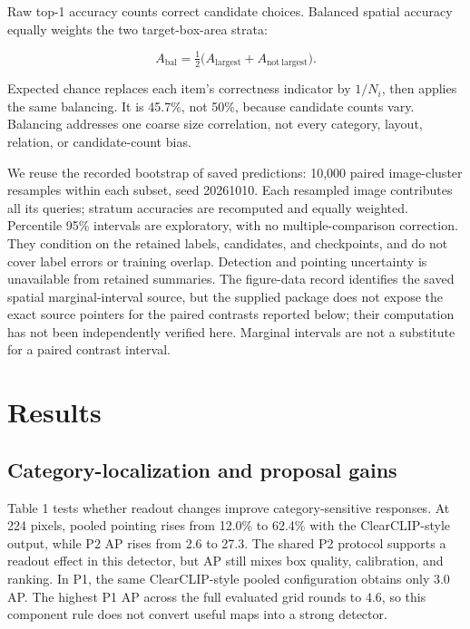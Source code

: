 \documentclass[10pt,twocolumn,letterpaper]{article}
\begin{document}
Raw top-1 accuracy counts correct candidate choices. Balanced spatial
accuracy equally weights the two target-box-area strata:

\[
A_{\mathrm{bal}}=\tfrac12\big(A_{\mathrm{largest}}+A_{\mathrm{not\ largest}}\big).
\]

Expected chance replaces each item's correctness indicator by \(1/N_i\),
then applies the same balancing. It is 45.7\%, not 50\%, because
candidate counts vary. Balancing addresses one coarse size correlation,
not every category, layout, relation, or candidate-count bias.

We reuse the recorded bootstrap of saved predictions: 10,000 paired
image-cluster resamples within each subset, seed 20261010. Each
resampled image contributes all its queries; stratum accuracies are
recomputed and equally weighted. Percentile 95\% intervals are
exploratory, with no multiple-comparison correction. They condition on
the retained labels, candidates, and checkpoints, and do not cover label
errors or training overlap. Detection and pointing uncertainty is
unavailable from retained summaries. The figure-data record identifies
the saved spatial marginal-interval source, but the supplied package
does not expose the exact source pointers for the paired contrasts
reported below; their computation has not been independently verified
here. Marginal intervals are not a substitute for a paired contrast
interval.

\section{Results}\label{results}

\subsection{Category-localization and proposal
gains}\label{category-localization-and-proposal-gains}

Table 1 tests whether readout changes improve category-sensitive
responses. At 224 pixels, pooled pointing rises from 12.0\% to 62.4\%
with the ClearCLIP-style output, while P2 AP rises from 2.6 to 27.3. The
shared P2 protocol supports a readout effect in this detector, but AP
still mixes box quality, calibration, and ranking. In P1, the same
ClearCLIP-style pooled configuration obtains only 3.0 AP. The highest P1
AP across the full evaluated grid rounds to 4.6, so this component rule
does not convert useful maps into a strong detector.
\end{document}
